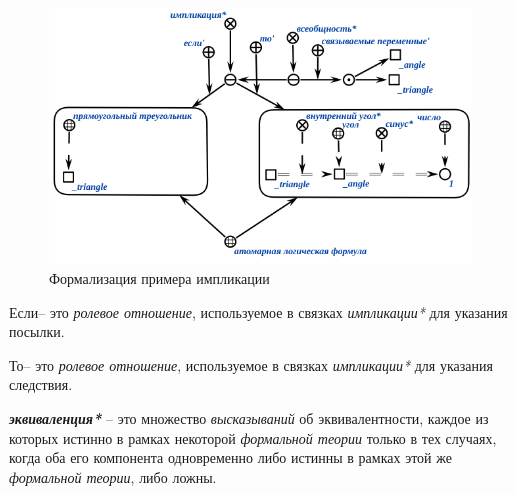 \begin{figure}[http]
	\includegraphics[scale=0.8]{author/part2/figures/logic/implication_triangle.png}
	\caption{Формализация примера импликации}
	\label{fig:implication_triangle}
\end{figure}

\begin{SCn}
\scnsubset{1\scnrolesign}
\end{SCn}

Если\scnrolesign -- это \textit{ролевое отношение}, используемое в связках \textit{импликации*} для указания посылки.

\begin{SCn}
\scnsubset{2\scnrolesign}
\end{SCn}

То\scnrolesign -- это \textit{ролевое отношение}, используемое в связках \textit{импликации*} для указания следствия.

\begin{SCn}
\end{SCn}

\textbf{\textit{эквиваленция*}} -- это множество \textit{высказываний} об эквивалентности, каждое из которых истинно в рамках некоторой \textit{формальной теории} только в тех случаях, когда оба его компонента одновременно либо истинны в рамках этой же \textit{формальной теории}, либо ложны.

